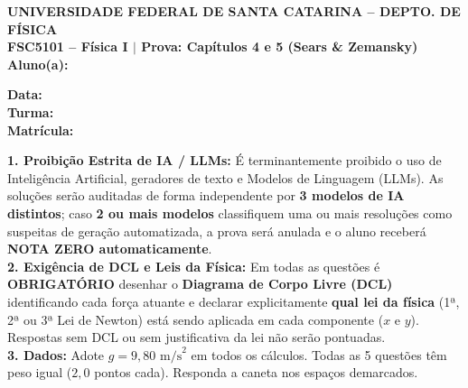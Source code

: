 \documentclass[10pt,a4paper]{article}
\begin{document}

\noindent
\begin{minipage}[t]{0.70\textwidth}
    \textbf{\small UNIVERSIDADE FEDERAL DE SANTA CATARINA -- DEPTO. DE FÍSICA}\\
    \textbf{\small FSC5101 -- Física I $\vert$ Prova: Capítulos 4 e 5 (Sears \& Zemansky)}\\
    \textbf{\small Aluno(a):} \underline{\hspace{8.2cm}}
\end{minipage}
\hfill
\begin{minipage}[t]{0.28\textwidth}
    \raggedleft
    \textbf{\small Data:} \underline{\hspace{2.2cm}}\\[1mm]
    \textbf{\small Turma:} \underline{\hspace{1.8cm}}\\[1mm]
    \textbf{\small Matrícula:} \underline{\hspace{2.0cm}}
\end{minipage}

\vspace{1.5mm}

\begin{tcolorbox}
\footnotesize
\textbf{1. Proibição Estrita de IA / LLMs:} É terminantemente proibido o uso de Inteligência Artificial, geradores de texto e Modelos de Linguagem (LLMs). As soluções serão auditadas de forma independente por \textbf{3 modelos de IA distintos}; caso \textbf{2 ou mais modelos} classifiquem uma ou mais resoluções como suspeitas de geração automatizada, a prova será anulada e o aluno receberá \textbf{NOTA ZERO automaticamente}.\\
\textbf{2. Exigência de DCL e Leis da Física:} Em todas as questões é \textbf{OBRIGATÓRIO} desenhar o \textbf{Diagrama de Corpo Livre (DCL)} identificando cada força atuante e declarar explicitamente \textbf{qual lei da física} (1ª, 2ª ou 3ª Lei de Newton) está sendo aplicada em cada componente ($x$ e $y$). Respostas sem DCL ou sem justificativa da lei não serão pontuadas.\\
\textbf{3. Dados:} Adote $g = 9,80\text{ m/s}^2$ em todos os cálculos. Todas as 5 questões têm peso igual ($2,0$ pontos cada). Responda a caneta nos espaços demarcados.
\end{tcolorbox}
\end{document}

